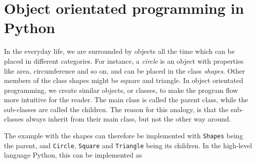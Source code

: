 \section{Object orientated programming in Python}
In the everyday life, we are surrounded by objects all the time which can be placed in different categories. For instance, a \textit{circle} is an object with properties like area, circumference and so on, and can be placed in the class \textit{shapes}. Other members of the class shapes might be square and triangle. In object orientated programming, we create similar objects, or classes, to make the program flow more intuitive for the reader. The main class is called the parent class, while the sub-classes are called the children. The reason for this analogy, is that the sub-classes always inherit from their main class, but not the other way around. 

The example with the shapes can therefore be implemented with \texttt{Shapes} being the parent, and \texttt{Circle}, \texttt{Square} and \texttt{Triangle} being its children. In the high-level language Python, this can be implemented as 

